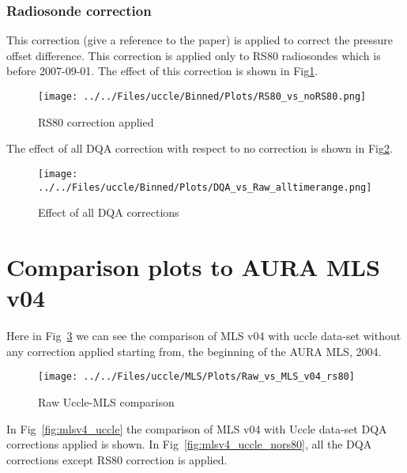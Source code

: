  \subsubsection{Radiosonde correction}
    This correction (give a reference to the paper) is applied to correct the pressure offset difference. This correction is applied
only to RS80 radiosondes which is before 2007-09-01. The effect of this correction is shown in Fig\ref{fig:rs80}.

                        \begin{figure}
        \centering
\texttt{[image: ../../Files/uccle/Binned/Plots/RS80\_vs\_noRS80.png]}
    \caption{RS80 correction applied}
            \label{fig:rs80}
    \end{figure}

The effect of all DQA correction with respect to no correction is shown in Fig\ref{fig:dqa_all}.

                        \begin{figure}
        \centering
\texttt{[image: ../../Files/uccle/Binned/Plots/DQA\_vs\_Raw\_alltimerange.png]}
    \caption{Effect of all DQA corrections}
            \label{fig:dqa_all}
    \end{figure}


\section{Comparison plots to AURA MLS v04}
\label{sec:mls}

        Here in Fig~\ref{fig:raw_uccle} we can see the comparison of MLS v04 with  uccle data-set without any correction applied starting from, the beginning of the AURA MLS, 2004.

    \begin{figure}
        \centering
\texttt{[image: ../../Files/uccle/MLS/Plots/Raw\_vs\_MLS\_v04\_rs80]}
    \caption{Raw Uccle-MLS comparison}
            \label{fig:raw_uccle}
    \end{figure}


In Fig~\ref{fig:mlsv4_uccle} the comparison of MLS v04 with Uccle data-set DQA corrections applied is shown. In Fig~\ref{fig:mlsv4_uccle_nors80},
all the DQA corrections except RS80 correction is applied.

